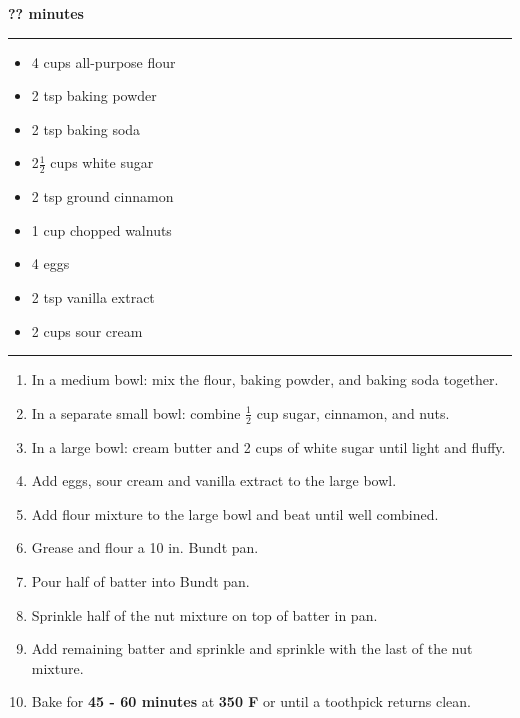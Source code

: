  \hfill {\large \textbf{?? minutes}}

\vspace{15pt} \hrule \vspace{15pt}
\begin{itemize}
	\item 4 cups all-purpose flour
	\item 2 tsp baking powder
	\item 2 tsp baking soda
	\item 2$\frac{1}{2}$ cups white sugar
	\item 2 tsp ground cinnamon
	\item 1 cup chopped walnuts
	\item 4 eggs
	\item 2 tsp vanilla extract
	\item 2 cups sour cream
\end{itemize}

\vspace{15pt} \hrule \vspace{15pt}
\begin{enumerate}
	\item In a medium bowl: mix the flour, baking powder, and baking soda together.
	\item In a separate small bowl: combine $\frac{1}{2}$ cup sugar, cinnamon, and nuts.
	\item In a large bowl: cream butter and 2 cups of white sugar until light and fluffy.
	\item Add eggs, sour cream and vanilla extract to the large bowl.
	\item Add flour mixture to the large bowl and beat until well combined.
	\item Grease and flour a 10 in. Bundt pan.
	\item Pour half of batter into Bundt pan.
	\item Sprinkle half of the nut mixture on top of batter in pan.
	\item Add remaining batter and sprinkle and sprinkle with the last of the nut mixture.
	\item Bake for \textbf{45 - 60 minutes} at \textbf{350 F} or until a toothpick returns clean.
\end{enumerate}
